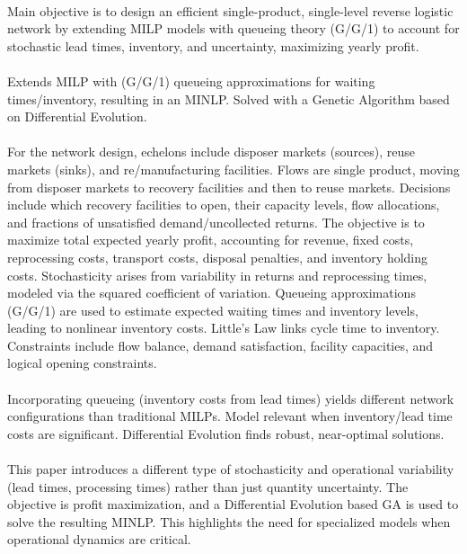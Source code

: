 \paragraph{} Main objective is to design an efficient single-product, single-level reverse logistic network by extending MILP models with queueing theory (G/G/1) to account for stochastic lead times, inventory, and uncertainty, maximizing yearly profit.

\paragraph{} Extends MILP with (G/G/1) queueing approximations for waiting times/inventory, resulting in an MINLP. Solved with a Genetic Algorithm based on Differential Evolution.

\paragraph{} For the network design, echelons include disposer markets (sources), reuse markets (sinks), and re/manufacturing facilities. Flows are single product, moving from disposer markets to recovery facilities and then to reuse markets. Decisions include which recovery facilities to open, their capacity levels, flow allocations, and fractions of unsatisfied demand/uncollected returns. The objective is to maximize total expected yearly profit, accounting for revenue, fixed costs, reprocessing costs, transport costs, disposal penalties, and inventory holding costs. Stochasticity arises from variability in returns and reprocessing times, modeled via the squared coefficient of variation. Queueing approximations (G/G/1) are used to estimate expected waiting times and inventory levels, leading to nonlinear inventory costs. Little's Law links cycle time to inventory. Constraints include flow balance, demand satisfaction, facility capacities, and logical opening constraints.

\paragraph{} Incorporating queueing (inventory costs from lead times) yields different network configurations than traditional MILPs. Model relevant when inventory/lead time costs are significant. Differential Evolution finds robust, near-optimal solutions.

\paragraph{} This paper introduces a different type of stochasticity and operational variability (lead times, processing times) rather than just quantity uncertainty. The objective is profit maximization, and a Differential Evolution based GA is used to solve the resulting MINLP. This highlights the need for specialized models when operational dynamics are critical.

